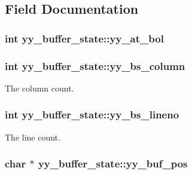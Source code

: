 \subsection{Field Documentation}
\hypertarget{structyy__buffer__state_a9d60c60af6e1a6f69de16871fd64f85f}{
\subsubsection[{yy\+\_\+at\+\_\+bol}]{\setlength{\rightskip}{0pt plus 5cm}int yy\+\_\+buffer\+\_\+state\+::yy\+\_\+at\+\_\+bol}}\label{structyy__buffer__state_a9d60c60af6e1a6f69de16871fd64f85f}
\hypertarget{structyy__buffer__state_a10c4fcd8be759e6bf11e6d3e8cdb0307}{
\subsubsection[{yy\+\_\+bs\+\_\+column}]{\setlength{\rightskip}{0pt plus 5cm}int yy\+\_\+buffer\+\_\+state\+::yy\+\_\+bs\+\_\+column}}\label{structyy__buffer__state_a10c4fcd8be759e6bf11e6d3e8cdb0307}
The column count. \hypertarget{structyy__buffer__state_a818e94bc9c766e683c60df1e9fd01199}{
\subsubsection[{yy\+\_\+bs\+\_\+lineno}]{\setlength{\rightskip}{0pt plus 5cm}int yy\+\_\+buffer\+\_\+state\+::yy\+\_\+bs\+\_\+lineno}}\label{structyy__buffer__state_a818e94bc9c766e683c60df1e9fd01199}
The line count. \hypertarget{structyy__buffer__state_a8435c3f786bbb55d21d0174e4cfc22a0}{
\subsubsection[{yy\+\_\+buf\+\_\+pos}]{\setlength{\rightskip}{0pt plus 5cm}char $\ast$ yy\+\_\+buffer\+\_\+state\+::yy\+\_\+buf\+\_\+pos}}\label{structyy__buffer__state_a8435c3f786bbb55d21d0174e4cfc22a0}
